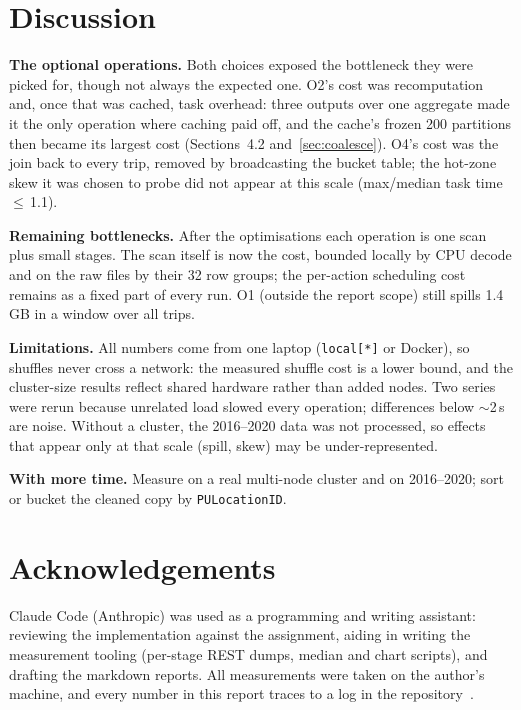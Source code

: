 \documentclass[sigconf]{acmart}
\begin{document}
\section{Discussion}

\textbf{The optional operations.} Both choices exposed the bottleneck they were
picked for, though not always the expected one. O2's cost was recomputation and,
once that was cached, task overhead: three outputs over one aggregate made it
the only operation where caching paid off, and the cache's frozen 200
partitions then became its largest cost (Sections~4.2 and~\ref{sec:coalesce}).
O4's cost was the join back to every trip, removed by broadcasting the bucket
table; the hot-zone skew it was chosen to probe did not appear at this scale
(max/median task time $\le$\,1.1).

\textbf{Remaining bottlenecks.} After the optimisations each operation is one scan
plus small stages. The scan itself is now the cost, bounded locally by CPU decode
and on the raw files by their 32 row groups; the per-action scheduling cost
remains as a fixed part of every run. O1 (outside the report scope) still spills
1.4\,GB in a window over all trips.

\textbf{Limitations.} All numbers come from one laptop (\texttt{local[*]} or
Docker), so shuffles never cross a network: the measured shuffle cost is a lower
bound, and the cluster-size results reflect shared hardware rather than added
nodes. Two series were rerun because unrelated load slowed every operation;
differences below $\sim$2\,s are noise. Without a cluster, the 2016--2020 data
was not processed, so effects that appear only at that scale (spill, skew) may
be under-represented.

\textbf{With more time.} Measure on a real multi-node cluster and on 2016--2020;
sort or bucket the cleaned copy by \texttt{PULocationID}.

\clearpage




\section*{Acknowledgements}
Claude Code (Anthropic) was used as a programming and writing assistant:
reviewing the implementation against the assignment, aiding in writing the measurement tooling
(per-stage REST dumps, median and chart scripts), and drafting the markdown reports.
All measurements were taken on the author's machine, and every number in this report traces to
a log in the repository~\cite{repo}.
\end{document}

